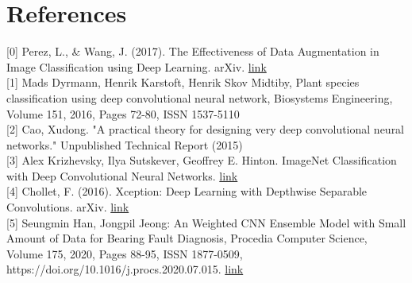 \documentclass[11pt, oneside]{article}
\begin{document}
\section*{References}
[0] Perez, L., \& Wang, J. (2017). The Effectiveness of Data Augmentation in Image Classification using Deep Learning. arXiv. \href{https://doi.org/10.48550/arXiv.1712.04621}{link}\\
{[1]} Mads Dyrmann, Henrik Karstoft, Henrik Skov Midtiby, Plant species classification using deep convolutional neural network, Biosystems Engineering, Volume 151, 2016, Pages 72-80, ISSN 1537-5110 \\
{[2]} Cao, Xudong. "A practical theory for designing very deep convolutional neural networks." Unpublished Technical Report (2015) \\
{[3]} Alex Krizhevsky, Ilya Sutskever, Geoffrey E. Hinton. ImageNet Classification with Deep Convolutional Neural Networks. \href{https://proceedings.neurips.cc/paper/2012/file/c399862d3b9d6b76c8436e924a68c45b-Paper.pdf}{link} \\
{[4]} Chollet, F. (2016). Xception: Deep Learning with Depthwise Separable Convolutions. arXiv. \href{https://arxiv.org/pdf/1610.02357.pdf}{link}\\
{[5]} Seungmin Han, Jongpil Jeong:
An Weighted CNN Ensemble Model with Small Amount of Data for Bearing Fault Diagnosis, Procedia Computer Science,
Volume 175, 2020, Pages 88-95, ISSN 1877-0509, \\
https://doi.org/10.1016/j.procs.2020.07.015. \href{https://www.sciencedirect.com/science/article/pii/S187705092031694X}{link}
\end{document}
